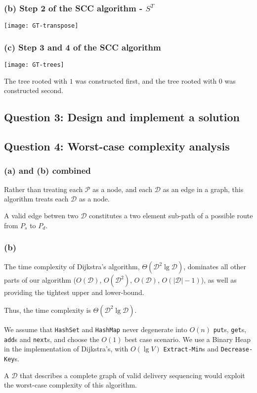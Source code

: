 \documentclass[11pt,a4paper]{article}
\begin{document}
\subsubsection*{(b) Step 2 of the SCC algorithm - $S^T$}

\texttt{[image: GT-transpose]}

\subsubsection*{(c) Step 3 and 4 of the SCC algorithm}

\texttt{[image: GT-trees]}

The tree rooted with $1$ was constructed first, and the tree rooted with $0$ was constructed second.

\newpage

\subsection*{Question 3: Design and implement a solution}

\subsection*{Question 4: Worst-case complexity analysis}


\subsubsection*{(a) and (b) combined}

Rather than treating each $\mathcal{P}$ as a node, and each $\mathcal{D}$ as an edge in a graph, this algorithm treats each $\mathcal{D}$ as a node. 

A valid edge betwen two $\mathcal{D}$ constitutes a two element sub-path of a possible route from $P_s$ to $P_d$.

\begingroup
\fontsize{11pt}{11pt}\selectfont
 
\endgroup

\subsubsection*{(b)}

The time complexity of Dijkstra's algorithm, $\Theta(\mathcal{D}^2 \lg \mathcal{D})$, dominates all other parts of our algorithm ($O(\mathcal{D})$, $O(\mathcal{D}^2)$, $O(\mathcal{D})$, $O(\vert\mathcal{D} \vert - 1)$), as well as providing the tightest upper and lower-bound.


Thus, the time complexity is $\Theta(\mathcal{D}^2 \lg \mathcal{D})$.

We assume that \texttt{HashSet} and \texttt{HashMap} never degenerate into $O(n)$ \texttt{put}s, \texttt{get}s, \texttt{add}s and \texttt{next}s, and choose the $O(1)$ best case scenario. We use a Binary Heap in the implementation of Dijkstra's, with $O(\lg V)$ \texttt{Extract-Min}s and \texttt{Decrease-Key}s.

A $\mathcal{D}$ that describes a complete graph of valid delivery sequencing would exploit the worst-case complexity of this algorithm.
\end{document}
